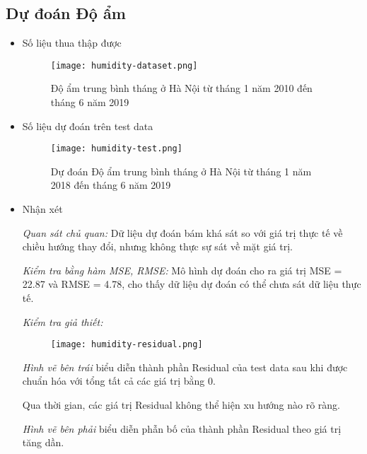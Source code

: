 \documentclass[12pt]{article}
\begin{document}
    \subsection{Dự đoán Độ ẩm}
    \begin{itemize}
        \item Số liệu thua thập được
            \begin{figure}[H]
                \centering
                \texttt{[image: humidity-dataset.png]}
                \caption{Độ ẩm trung bình tháng ở Hà Nội từ tháng 1 năm 2010 đến tháng 6 năm 2019}
            \end{figure}
        
        \item Số liệu dự đoán trên test data
            \begin{figure}[H]
                \centering
                \texttt{[image: humidity-test.png]}
                \caption{Dự đoán Độ ẩm trung bình tháng ở Hà Nội từ tháng 1 năm 2018 đến tháng 6 năm 2019}
            \end{figure}
            
        \item Nhận xét
        
            \textit{Quan sát chủ quan:} Dữ liệu dự đoán bám khá sát so với giá trị thực tế về chiều hướng thay đổi, nhưng không thực sự sát về mặt giá trị.
            
            \textit{Kiểm tra bằng hàm MSE, RMSE:} Mô hình dự đoán cho ra giá trị MSE = 22.87 và RMSE = 4.78, cho thấy dữ liệu dự đoán có thể chưa sát dữ liệu thực tế.
            
            \textit{Kiểm tra giả thiết:}
            
            \begin{figure}[H]
                \centering
                \texttt{[image: humidity-residual.png]}
                \caption{}
            \end{figure}
            
            \textit{Hình vẽ bên trái} biểu diễn thành phần Residual của test data sau khi được chuẩn hóa với tổng tất cả các giá trị bằng 0.
            
            Qua thời gian, các giá trị Residual không thể hiện xu hướng nào rõ ràng.
            
            \textit{Hình vẽ bên phải} biểu diễn phẫn bố của thành phần Residual theo giá trị tăng dần. 
            

\end{itemize}
\end{document}
